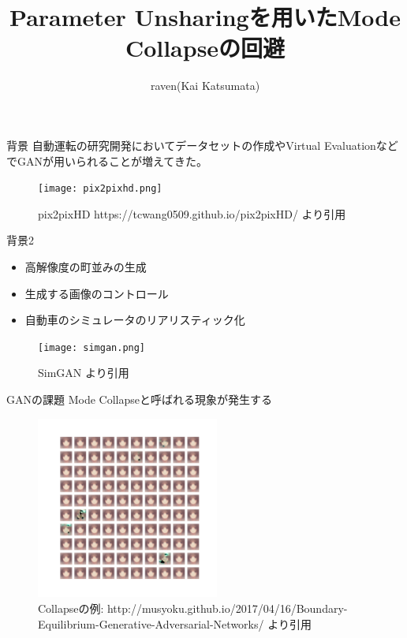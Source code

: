 \documentclass[dvipdfmx,12pt,unicode]{beamer}
\title{Parameter Unsharingを用いたMode Collapseの回避}
\author{raven(Kai Katsumata)}
\institute[JPN]{SL B2 \\ 親 ryoga}
\begin{document}
\begin{frame}\frametitle{}
  \maketitle
\end{frame}

\begin{frame}{背景}
  自動運転の研究開発においてデータセットの作成やVirtual EvaluationなどでGAN\cite{gan}が用いられることが増えてきた。
  \begin{figure}[htb]
    \centering    
    \texttt{[image: pix2pixhd.png]}
    \caption{pix2pixHD {\scriptsize https://tcwang0509.github.io/pix2pixHD/ より引用}}
  \end{figure}        
\end{frame}

\begin{frame}{背景2}
  \begin{itemize}
  \item 高解像度の町並みの生成\cite{pix2pixhd}
  \item 生成する画像のコントロール\cite{pix2pixhd}
  \item 自動車のシミュレータのリアリスティック化\cite{simgan}
  \end{itemize}
  \begin{figure}[htb]
    \centering    
    \texttt{[image: simgan.png]}
    \caption{SimGAN \cite{simgan}より引用}
  \end{figure}          
\end{frame}

\begin{frame}{GANの課題}
  Mode Collapseと呼ばれる現象が発生する
  \begin{figure}[htb]
    \centering
    \includegraphics[height=6cm]{collapse.png}
    \vspace*{-1cm}    
    \caption{Collapseの例: {\scriptsize http://musyoku.github.io/2017/04/16/Boundary-Equilibrium-Generative-Adversarial-Networks/ より引用} \label{fig:collapse}}
  \end{figure}  
\end{frame}
\end{document}
